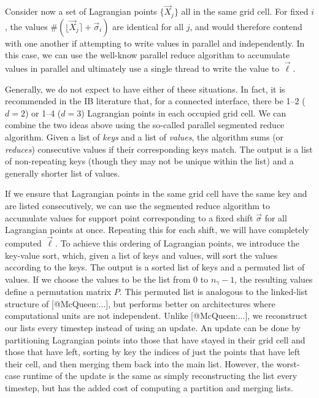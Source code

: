 Consider now a set of Lagrangian points $\{\vec{X}_j\}$ all in the same grid
cell. For fixed $i$, the values $\#(\lfloor\vec{X}_j\rceil+\vec{\sigma}_i)$ are
identical for all $j$, and would therefore contend with one another if
attempting to write values in parallel and independently. In this case, we
can use the well-know parallel reduce algorithm to accumulate values in
parallel and ultimately use a single thread to write the value to $\vec{\ell}$.

Generally, we do not expect to have either of these situations. In fact, it is
recommended in the IB literature that, for a connected interface, there be
1--2 ($d=2$) or 1--4 ($d=3$) Lagrangian points in each occupied grid cell. We
can combine the two ideas above using the so-called parallel segmented reduce
algorithm. Given a list of \emph{keys} and a list of \emph{values}, the
algorithm sums (or \emph{reduces}) consecutive values if their corresponding
keys match. The output is a list of non-repeating keys (though they may not be
unique within the list) and a generally shorter list of values.

If we ensure that Lagrangian points in the same grid cell have the same key
and are listed consecutively, we can use the segmented reduce algorithm to
accumulate values for support point corresponding to a fixed shift
$\vec{\sigma}$ for all Lagrangian points at once. Repeating this for each
shift, we will have completely computed $\vec{\ell}$. To achieve this ordering
of Lagrangian points, we introduce the key-value sort, which, given a list
of keys and values, will sort the values according to the keys. The output is
a sorted list of keys and a permuted list of values. If we choose the values to
be the list from 0 to $n_\gamma-1$, the resulting values define a permutation
matrix $P$. This permuted list is analogous to the linked-list structure of
[@McQueen:...], but performs better on architectures where computational units
are not independent. Unlike [@McQueen:...], we reconstruct our lists every
timestep instead of using an update. An update can be done by partitioning
Lagrangian points into those that have stayed in their grid cell and those that
have left, sorting by key the indices of just the points that have left their
cell, and then merging them back into the main list. However, the worst-case
runtime of the update is the same as simply reconstructing the list every
timestep, but has the added cost of computing a partition and merging lists.

